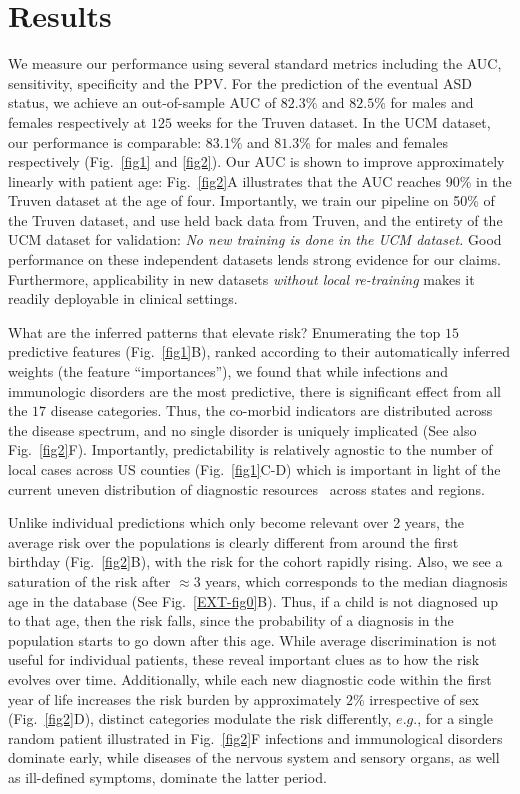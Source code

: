 \documentclass[3p,super,numbers,sort&compress,preprint,10pt]{elsarticle}
\begin{document}
\section*{Results}


We measure our performance using several standard metrics including the AUC, sensitivity, specificity and the PPV. For the prediction of the eventual ASD  status, we achieve an out-of-sample AUC of $82.3\%$ and  $82.5\%$ for males and females respectively at $125$ weeks for the Truven dataset. In the UCM dataset, our performance is comparable: $83.1\%$ and $81.3\%$ for males and females respectively (Fig.~\ref{fig1} and \ref{fig2}).  Our AUC is shown to improve approximately  linearly  with patient age: Fig.~\ref{fig2}A illustrates that the  AUC  reaches 90\%  in the Truven dataset at the age of four. Importantly, we train  our  pipeline on 50\% of the Truven dataset, and use held back data from Truven, and the entirety of the UCM dataset for validation: \textit{No new training is done in the UCM dataset.} Good  performance on these independent datasets lends strong evidence for our claims. Furthermore, applicability in new datasets \textit{without local re-training} makes it readily  deployable in clinical settings.

What are the inferred patterns that  elevate risk?  Enumerating the top $15$ predictive features (Fig.~\ref{fig1}B), ranked  according to their automatically inferred weights  (the feature ``importances''), we found that while infections and immunologic disorders are the most predictive, there is significant effect from all the $17$ disease categories. Thus, the  co-morbid indicators are  distributed across the disease spectrum, and no single  disorder is uniquely implicated (See also Fig.~\ref{fig2}F). Importantly, predictability is relatively agnostic to the number of local cases across US counties (Fig.~\ref{fig1}C-D) which is important in light of the current uneven distribution of  diagnostic resources~\cite{gordon2016whittling,althouse2006pediatric} across states and regions.

Unlike individual predictions which only become relevant over 2 years, the average risk over the populations is clearly different  from around the  first birthday (Fig.~\ref{fig2}B), with the risk for the  \treatment cohort rapidly rising. Also, we see a saturation of the risk after $\approx 3$ years, which corresponds to the median diagnosis age in the database (See Fig.~\ref{EXT-fig0}B). Thus, if a child is not diagnosed up to that age, then the  risk  falls, since the probability of a diagnosis in the population starts to go down after this age. While average discrimination is not useful for individual patients, these reveal important clues as to how the  risk evolves over time. Additionally, while  each  new diagnostic code within the first year of life  increases the risk burden by approximately $2\%$ irrespective of sex (Fig.~\ref{fig2}D), distinct  categories modulate the risk differently, $e.g.$, for a single random patient  illustrated in Fig.~\ref{fig2}F infections and immunological disorders dominate early, while  diseases of the nervous system and sensory organs, as well as ill-defined symptoms,  dominate the latter period.
\end{document}
